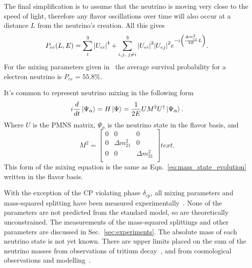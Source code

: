 The final simplification is to assume that the neutrino is moving very close
to the speed of light, therefore any flavor oscillations over time will also
occur at a distance $L$ from the neutrino's creation.
All this gives
\begin{equation}
    \label{eqn:pee_adiabatic}
    P_{ee}(L,E) = \sum_{i}^{3}\abs{U_{ei}}^4 +
    \sum_{i,j\text{, }j \ne i}^{3}
    \abs{U_{ei}}^2\abs{U_{ej}}^2e^{-i\left(\frac{\Delta m^{2}_{ij}}{2E}L\right)}\text{.}
\end{equation}
For the mixing parameters given in~\citep{PDG2016} the average survival probability
for a electron neutrino is $P_{ee} = 55.8\%$.

It's common to represent neutrino mixing in the following form
\begin{equation}
i\frac{d}{dt}\ket{\Psi_{\alpha}} = H\ket{\Psi} = \frac{1}{2E}UM^{2}U^{\dagger}\ket{\Psi_{\alpha}}\text{.}
\label{eq:mixing_hamiltonian}
\end{equation}
Where $U$ is the PMNS matrix, $\Psi_{\alpha}$ is the neutrino state in the  flavor
basis, and
\begin{equation}
M^{2} = 
\begin{bmatrix}
    0 & 0 & 0  \\
    0 & \Delta m^{2}_{21} & 0  \\
    0 & 0 & \Delta m^{2}_{31}  \\
\end{bmatrix}text{.}
\end{equation}
This form of the mixing equation is the same as Eqn.~\eqref{eq:mass_state_evolution}
written in the flavor basis.


With the exception of the CP violating phase $\delta_{cp}$, all mixing
parameters and mass-squared splitting have been measured experimentally~\citep{pdg_globalfit}.
None of the parameters are not predicted from the standard model, so are theoretically
unconstrained.
The measurements of the mass-squared splittings and
other parameters are discussed in Sec.~\ref{sec:experiments}.
The absolute mass of each neutrino state is not yet known.
There are upper limits placed on the sum of the neutrino masses from
observations of tritium decay~\citep{troitsk_mass}, and from cosmological
observations and modelling~\citep{cosmological_neutrino_mass}.

